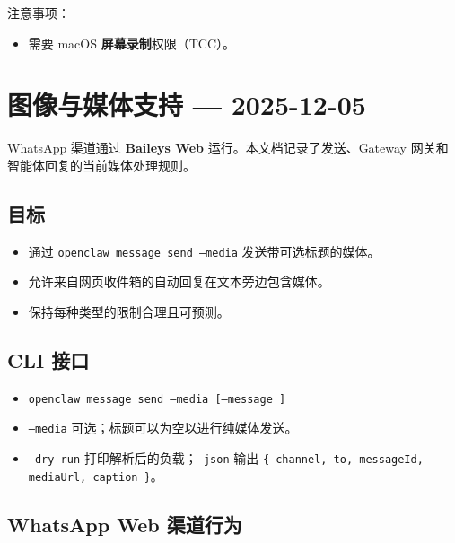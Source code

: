 注意事项：

\begin{itemize}
  \item 需要 macOS \textbf{屏幕录制}权限（TCC）。
\end{itemize}



\clearpage

\section{图像与媒体支持 — 2025-12-05}


WhatsApp 渠道通过 \textbf{Baileys Web} 运行。本文档记录了发送、Gateway 网关和智能体回复的当前媒体处理规则。

\subsection{目标}


\begin{itemize}
  \item 通过 \texttt{openclaw message send --media} 发送带可选标题的媒体。
  \item 允许来自网页收件箱的自动回复在文本旁边包含媒体。
  \item 保持每种类型的限制合理且可预测。
\end{itemize}


\subsection{CLI 接口}


\begin{itemize}
  \item \texttt{openclaw message send --media  [--message ]}
  \item \texttt{--media} 可选；标题可以为空以进行纯媒体发送。
  \item \texttt{--dry-run} 打印解析后的负载；\texttt{--json} 输出 \texttt{\{ channel, to, messageId, mediaUrl, caption \}}。
\end{itemize}


\subsection{WhatsApp Web 渠道行为}


